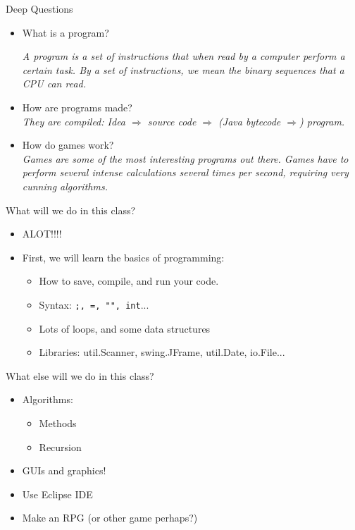 \begin{frame}{Deep Questions}
\begin{itemize}
\item What is a program?\\ \pause

\emph{A program is a set of instructions that when read by a computer perform a certain task. By a set of instructions, we mean the binary sequences that a CPU can read.} \pause

\item How are programs made?\\ \pause
\emph{They are compiled: Idea $\Rightarrow$ source code $\Rightarrow$ (Java bytecode $\Rightarrow$) program.}
\pause

\item How do games work?\\ \pause
\emph{Games are some of the most interesting programs out there. Games have to perform several intense calculations several times per second, requiring very cunning algorithms.}
\end{itemize}
\end{frame}

\begin{frame}{What will we do in this class?}
\begin{itemize}
\item ALOT!!!! \pause
\item First, we will learn the basics of programming:
    \begin{itemize}
    \item How to save, compile, and run your code. \pause
    \item Syntax: \texttt{;, =, "", int}... \pause
    \item Lots of loops, and some data structures \pause
    \item Libraries: util.Scanner, swing.JFrame, util.Date, io.File...
    \end{itemize}
\end{itemize}

\end{frame}

\begin{frame}{What else will we do in this class?}
\begin{itemize}
\item Algorithms:
    \begin{itemize}
    \item Methods \pause
    \item Recursion \pause
    \end{itemize}
\item GUIs and graphics! \pause
\item Use Eclipse IDE \pause
\item Make an RPG (or other game perhaps?)
\end{itemize}
\end{frame}


